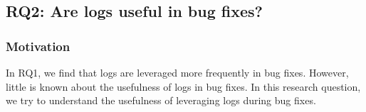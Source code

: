 \documentclass[conference]{IEEEtran}
\begin{document}

\subsection*{\textbf{RQ2: Are logs useful in bug fixes?}}


\subsubsection*{\textbf{Motivation}}

In RQ1, we find that logs are leveraged more frequently in bug fixes. However, little is known about the usefulness of logs in bug fixes. In this research question, we try to understand the usefulness of leveraging logs during bug fixes.

\end{document}
